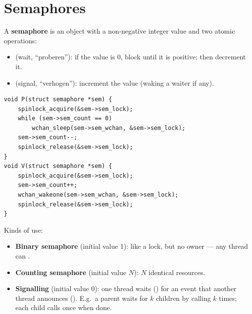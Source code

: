 \section{Semaphores}

\begin{definition}
A \textbf{semaphore} is an object with a non-negative integer value and two atomic operations:
\begin{itemize}
  \item {} (wait, ``proberen''): if the value is 0, block until it is positive; then
    decrement it.
  \item {} (signal, ``verhogen''): increment the value (waking a waiter if any).
\end{itemize}
\end{definition}

\begin{lstlisting}[style=c]
void P(struct semaphore *sem) {
    spinlock_acquire(&sem->sem_lock);
    while (sem->sem_count == 0)
        wchan_sleep(sem->sem_wchan, &sem->sem_lock);
    sem->sem_count--;
    spinlock_release(&sem->sem_lock);
}
void V(struct semaphore *sem) {
    spinlock_acquire(&sem->sem_lock);
    sem->sem_count++;
    wchan_wakeone(sem->sem_wchan, &sem->sem_lock);
    spinlock_release(&sem->sem_lock);
}
\end{lstlisting}

Kinds of use:
\begin{itemize}
  \item \textbf{Binary semaphore} (initial value 1): like a lock, but no owner --- any thread
    can .
  \item \textbf{Counting semaphore} (initial value $N$): $N$ identical resources.
  \item \textbf{Signalling} (initial value 0): one thread waits () for an event that
    another thread announces (). E.g.\ a parent waits for $k$ children by calling
     $k$ times; each child calls  once when done.
\end{itemize}

